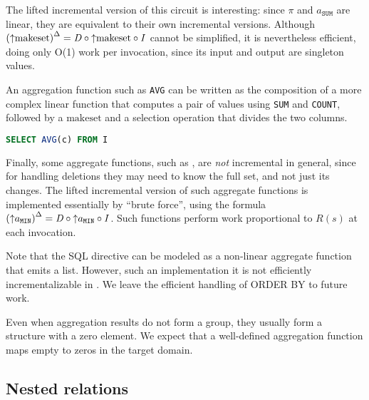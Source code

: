 The lifted incremental version of this circuit is interesting: since $\pi$
and $a_\texttt{SUM}$ are linear, they are equivalent to their own incremental
versions.  Although ${({\uparrow}\mbox{makeset})}^{\Delta} = \mathit{D} \circ {\uparrow}\mbox{makeset} \circ \mathit{I}$
cannot be simplified, it is nevertheless efficient, doing only O(1) work per
invocation, since its input and output are singleton values.

An aggregation function such as \texttt{AVG} can be written as the composition of
a more complex linear function that computes a pair of values using
\texttt{SUM} and \texttt{COUNT}, followed by a $\mbox{makeset}$ and a selection operation
that divides the two columns.

\begin{lstlisting}[language=SQL]
SELECT AVG(c) FROM I
\end{lstlisting}


Finally, some aggregate functions, such as , are
\emph{not} incremental in general, since for handling deletions
they may need to know the full set, and not just its changes.  The lifted
incremental version of such aggregate functions is implemented essentially
by ``brute force'', using the formula ${({\uparrow}a_\texttt{MIN})}^{\Delta}
= \mathit{D} \circ {\uparrow}a_\texttt{MIN} \circ \mathit{I}$.  Such functions perform work
proportional to $R(s)$ at each invocation.

Note that the SQL  directive can be modeled as
a non-linear aggregate function that emits a list.  However, such an implementation it is not efficiently incrementalizable in \dbsp.
We leave the efficient handling of ORDER BY to future work.

Even when aggregation results do not form a group, they usually form
a structure with a zero element.  We expect that a well-defined
aggregation function maps empty \zrs to zeros in the target domain.


\subsection{Nested relations}

